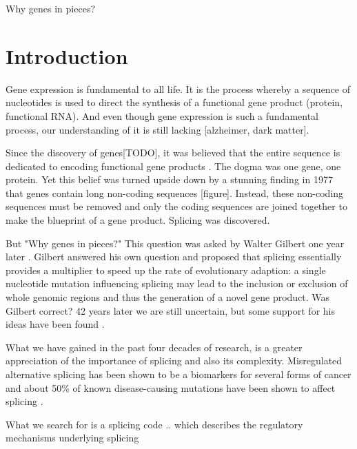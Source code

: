 \begin{savequote}[8cm]
Why genes in pieces?
\end{savequote}

\chapter{\label{ch:1-intro}Introduction} 
Gene expression is fundamental to all life. It is the process whereby a sequence of nucleotides is used to direct the synthesis of a functional gene product (protein, functional RNA). And even though gene expression is such a fundamental process, our understanding of it is still lacking [alzheimer, dark matter]. 

Since the discovery of genes[TODO], it was believed that the entire sequence is dedicated to encoding functional gene products \cite{onegeneoneprotein}. The dogma was one gene, one protein. Yet this belief was turned upside down by a stunning finding in 1977 that genes contain long non-coding sequences \cite{discoveryofsplicing} [figure]. Instead, these non-coding sequences must be removed and only the coding sequences are joined together to make the blueprint of a gene product. Splicing was discovered. 



But "Why genes in pieces?" This question was asked by Walter Gilbert one year later \cite{whygenesinpieces}. Gilbert answered his own question and proposed that splicing essentially provides a multiplier to speed up the rate of evolutionary adaption: a single nucleotide mutation influencing splicing may lead to the inclusion or exclusion of whole genomic regions and thus the generation of a novel gene product. Was Gilbert correct? 42 years later we are still uncertain, but some support for his ideas have been found \cite{whyrevisited}. %

What we have gained in the past four decades of research, is a greater appreciation of the importance of splicing and also its complexity. 
Misregulated alternative splicing has been shown to be a biomarkers for several forms of cancer \cite{cancer} \cite{splicingcausescancer} and about 50\% of known disease-causing mutations have been shown to affect splicing \cite{50diseasessplicing}. 

What we search for is a splicing code .. which describes the regulatory mechanisms underlying splicing 

